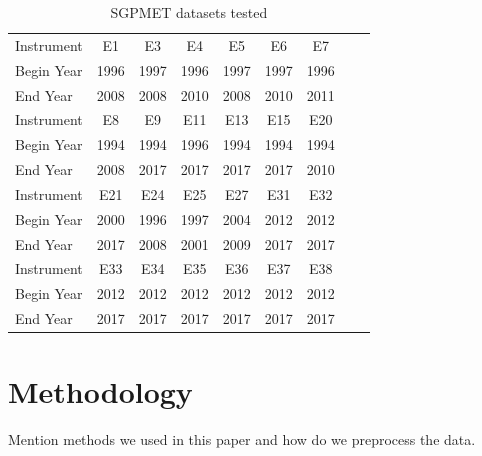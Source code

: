 \documentclass[letterpaper, 10 pt, conference]{ieeeconf}  %
\begin{document}
\begin{table}[ht]
\caption{SGPMET datasets tested}
\label{tab:datasets}
\centering
\begin{tabular}{|l|c|c|c|c|c|c|c|c|}
\hline
Instrument & E1 & E3 & E4 & E5 & E6 & E7\\
Begin Year & 1996 & 1997 & 1996 & 1997 & 1997 & 1996\\
End Year & 2008 & 2008 & 2010 & 2008 & 2010 & 2011\\
\hline
Instrument & E8 & E9 & E11 & E13 & E15 & E20\\
Begin Year & 1994 & 1994 & 1996 & 1994 & 1994 & 1994\\
End Year & 2008 & 2017 & 2017 & 2017 & 2017 & 2010\\
\hline
Instrument & E21 & E24 & E25 & E27 & E31 & E32\\
Begin Year & 2000 & 1996 & 1997 & 2004 & 2012 & 2012\\
End Year & 2017 & 2008 & 2001 & 2009 & 2017 & 2017\\
\hline
Instrument & E33 & E34 & E35 & E36 & E37 & E38\\
Begin Year & 2012 & 2012 & 2012 & 2012 & 2012 & 2012\\
End Year & 2017 & 2017 & 2017 & 2017 & 2017 & 2017\\
\hline
\end{tabular}
\end{table}

\section{Methodology}
Mention methods we used in this paper and how do we preprocess the data.
\end{document}
